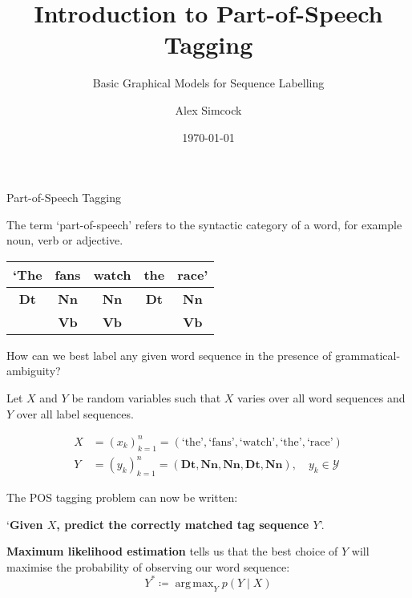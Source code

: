 \documentclass[envcountsect]{beamer}
\title{Introduction to Part-of-Speech Tagging}
\subtitle{Basic Graphical Models for Sequence Labelling}
\author{Alex Simcock}
\institute{University of Birmingham}
\date{\today}
\DeclareMathOperator*{\argmax}{arg\,max}
\begin{document}
\begin{frame}
\titlepage
\end{frame}

\begin{frame}{Part-of-Speech Tagging}

\begin{definition}
The term `part-of-speech' refers to the syntactic category of a word, for example noun, verb or adjective.
\end{definition}

\begin{example}
\begin{center}
\begin{tabular}{ c c c c c }
 `The & fans & watch & the & race' \\
 \hline
 \textbf{Dt} & \textbf{Nn} & \textbf{Nn} & \textbf{Dt} & \textbf{Nn} \\  
 & \textbf{Vb} & \textbf{Vb} & & \textbf{Vb}    
\end{tabular}
\end{center}
\end{example}

How can we best label any given word sequence in the presence of grammatical-ambiguity?


\end{frame}

\begin{frame}

\begin{definition}

Let $X$ and $Y$ be random variables such that $X$ varies over all word sequences and $Y$ over all label sequences.

\begin{align*}
    X &= (x_k)_{k=1}^n = (\text{`the'}, \text{`fans'}, \text{`watch'}, \text{`the'}, \text{`race'}) \\
    Y &= (y_k)_{k=1}^n = (\textbf{Dt}, \textbf{Nn}, \textbf{Nn}, \textbf{Dt}, \textbf{Nn}), \quad y_k \in \mathcal{Y}
\end{align*}

The POS tagging problem can now be written:

`\textbf{Given $X$, predict the correctly matched tag sequence $Y$}'.

\end{definition}


\textbf{Maximum likelihood estimation} tells us that the best choice of $Y$ will maximise the probability of observing our word sequence:
\begin{equation*}
    Y^* \coloneqq \argmax_{Y} p(Y \mid X)
\end{equation*}    

\end{frame}
\end{document}
